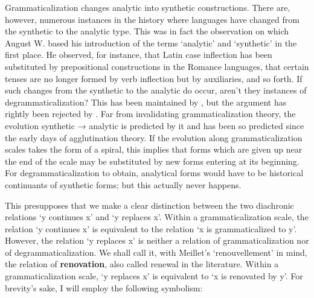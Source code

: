 Grammaticalization changes analytic into synthetic constructions. There are, however, numerous instances in the history where languages have changed from the synthetic to the analytic type. This was in fact the observation on which August W. \citet[14--30]{Schlegel1818} based his introduction of the terms ‘analytic’ and ‘synthetic’ in the first place. He observed, for instance, that Latin case inflection has been substituted by prepositional constructions in the Romance languages, that certain tenses are no longer formed by verb inflection but by auxiliaries, and so forth. If such changes from the synthetic to the analytic do occur, aren't they instances of degrammaticalization? This has been maintained by \citet[223--225]{Lightfoot1979}, but the argument has rightly been rejected by \citet[75f]{HeineEtAl1984}. Far from invalidating grammaticalization theory, the evolution synthetic → analytic is predicted by it and has been so predicted since the early days of agglutination theory. If the evolution along grammaticalization scales takes the form of a spiral, this implies that forms which are given up near the end of the scale may be substituted by new forms entering at its beginning. For degrammaticalization to obtain, analytical forms would have to be historical continuants of synthetic forms; but this actually never happens.

This presupposes that we make a clear distinction between the two diachronic relations ‘y continues x’ and ‘y replaces x’. Within a grammaticalization scale, the relation ‘y continues x’ is equivalent to the relation ‘x is grammaticalized to y’. However, the relation ‘y replaces x’ is neither a relation of grammaticalization nor of degrammaticalization. We shall call it, with Meillet's ‘renouvellement’ in mind, the relation of \textbf{renovation}, also called renewal in the literature. Within a grammaticalization scale, ‘y replaces x’ is equivalent to ‘x is renovated by y’. For brevity's sake, I will employ the following symbolism:

%	
%	
%	
%	
%
%	
	
